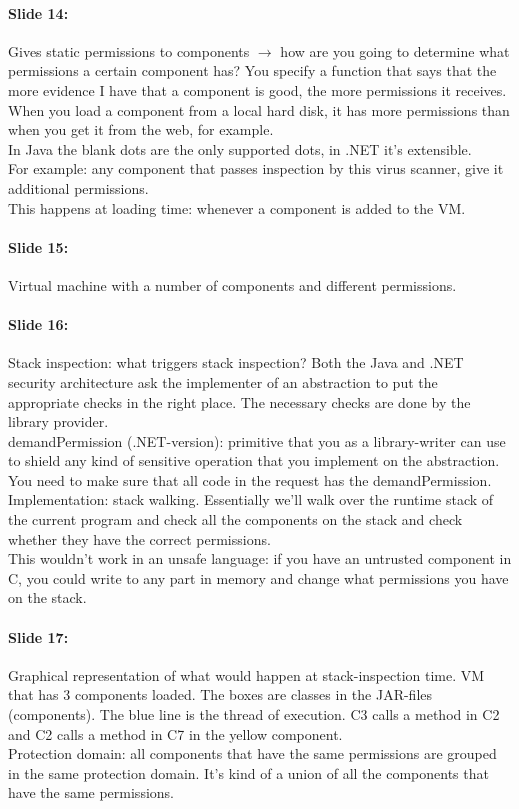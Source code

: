 \documentclass[10pt,a4paper]{report}
\begin{document}
\paragraph{Slide 14:} Gives static permissions to components $\rightarrow$ how are you going to determine what permissions a certain component has? You specify a function that says that the more evidence I have that a component is good, the more permissions it receives.\\
When you load a component from a local hard disk, it has more permissions than when you get it from the web, for example.\\
In Java the blank dots are the only supported dots, in .NET it's extensible.\\
For example: any component that passes inspection by this virus scanner, give it additional permissions.\\
This happens at loading time: whenever a component is added to the VM.

\paragraph{Slide 15:} Virtual machine with a number of components and different permissions. 

\paragraph{Slide 16:} Stack inspection: what triggers stack inspection? Both the Java and .NET security architecture ask the implementer of an abstraction to put the appropriate checks in the right place. The necessary checks are done by the library provider.\\
demandPermission (.NET-version): primitive that you as a library-writer can use to shield any kind of sensitive operation that you implement on the abstraction.\\
You need to make sure that all code in the request has the demandPermission. 
Implementation: stack walking. Essentially we'll walk over the runtime stack of the current program and check all the components on the stack and check whether they have the correct permissions.\\
This wouldn't work in an unsafe language: if you have an untrusted component in C, you could write to any part in memory and change what permissions you have on the stack. 

\paragraph{Slide 17:} Graphical representation of what would happen at stack-inspection time. VM that has 3 components loaded. The boxes are classes in the JAR-files (components). The blue line is the thread of execution. C3 calls a method in C2 and C2 calls a method in C7 in the yellow component.\\
Protection domain: all components that have the same permissions are grouped in the same protection domain. It's kind of a union of all the components that have the same permissions.
\end{document}
